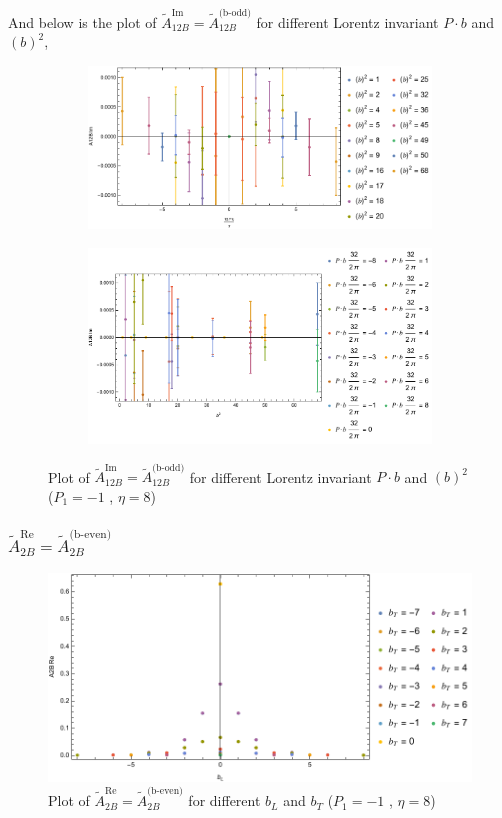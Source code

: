 \documentclass[]{article}
\numberwithin{equation}{section}
\newcommand{\tAmp}{\widetilde{A}}
\newcommand{\tAmp}{\ensuremath{\widetilde{A}^{(+)}}}
\begin{document}
And below is the plot of $\tAmp^{\text{Im}}_{12B}=\tAmp^{\text{(b-odd)}}_{12B}$ for different Lorentz invariant $P\cdot b$ and $(b)^2$,
\begin{figure}[h!]
     \centering
     \begin{subfigure}[b]{0.45\textwidth}
         \centering
         \includegraphics[width=\textwidth]{bP_A12B_b_odd_P1_-1_eta_8.pdf}
     \end{subfigure}
     \begin{subfigure}[b]{0.45\textwidth}
         \centering
         \includegraphics[width=\textwidth]{bsq_A12B_b_odd_P1_-1_eta_8.pdf}
     \end{subfigure}
        \caption{Plot of $\tAmp^{\text{Im}}_{12B}=\tAmp^{\text{(b-odd)}}_{12B}$ for different Lorentz invariant $P\cdot b$ and $(b)^2$  ($P_{1} = -1$ , $\eta=8$)}
\end{figure}





\subsubsection{$\tAmp^{\text{Re}}_{2B}=\tAmp^{\text{(b-even)}}_{2B}$}
\begin{figure}[h!]
    \centering
    \includegraphics[width=0.45\linewidth]{bLbT_A2B_b_even_P1_-1_eta_8.pdf}
    \caption{Plot of  $\tAmp^{\text{Re}}_{2B}=\tAmp^{\text{(b-even)}}_{2B}$ for different $b_{L}$ and $b_{T}$  ($P_{1} = -1$ , $\eta=8$)}
\end{figure}
\end{document}
